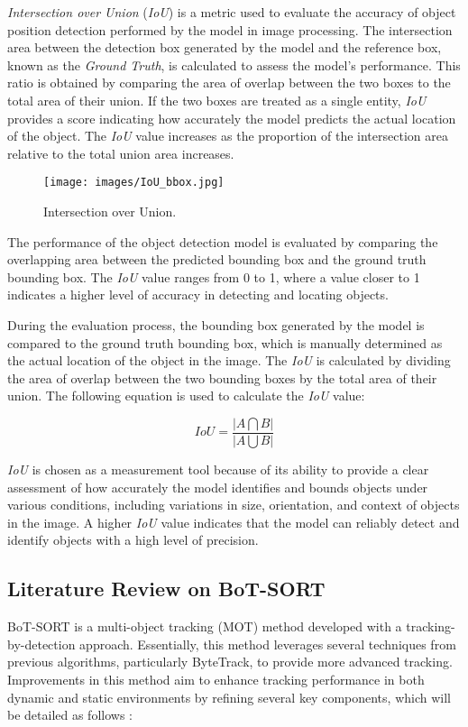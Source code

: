 \emph{Intersection over Union} (\emph{IoU}) is a metric used to evaluate the accuracy of object position detection performed by the model in image processing. The intersection area between the detection box generated by the model and the reference box, known as the \emph{Ground Truth}, is calculated to assess the model's performance. This ratio is obtained by comparing the area of overlap between the two boxes to the total area of their union. If the two boxes are treated as a single entity, \emph{IoU} provides a score indicating how accurately the model predicts the actual location of the object. The \emph{IoU} value increases as the proportion of the intersection area relative to the total union area increases.

\begin{figure}[H]
  \centering
  \texttt{[image: images/IoU\_bbox.jpg]}
  \caption{Intersection over Union.}
  \label{fig:IoU_bbox}
\end{figure}

The performance of the object detection model is evaluated by comparing the overlapping area between the predicted bounding box and the ground truth bounding box. The \emph{IoU} value ranges from 0 to 1, where a value closer to 1 indicates a higher level of accuracy in detecting and locating objects.

During the evaluation process, the bounding box generated by the model is compared to the ground truth bounding box, which is manually determined as the actual location of the object in the image. The \emph{IoU} is calculated by dividing the area of overlap between the two bounding boxes by the total area of their union. The following equation is used to calculate the \emph{IoU} value:

\begin{equation}
  IoU = \frac{\left |A \bigcap B \right |}{\left | A \bigcup B \right |}
\end{equation}

\emph{IoU} is chosen as a measurement tool because of its ability to provide a clear assessment of how accurately the model identifies and bounds objects under various conditions, including variations in size, orientation, and context of objects in the image. A higher \emph{IoU} value indicates that the model can reliably detect and identify objects with a high level of precision.

\subsection{Literature Review on BoT-SORT}

BoT-SORT is a multi-object tracking (MOT) method developed with a tracking-by-detection approach. Essentially, this method leverages several techniques from previous algorithms, particularly ByteTrack, to provide more advanced tracking. Improvements in this method aim to enhance tracking performance in both dynamic and static environments by refining several key components, which will be detailed as follows \cite{aharon2022botsortrobustassociationsmultipedestrian}: